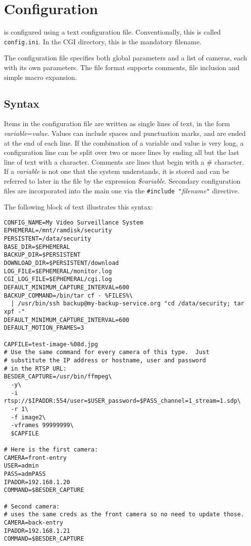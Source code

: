 \clearpage
\section{Configuration}
\label{config}

  \PRODUCT{} is configured using a text configuration file.
  Conventionally, this is called \texttt{config.ini}.  In the
  CGI directory, this is the mandatory filename.

  The configuration file specifies both global parameters and a list of
  cameras, each with its own parameters.  The file format
  supports comments, file inclusion and simple macro expansion.

  \subsection{Syntax}

    \BI
    \I Items in the configuration file are written as single lines of text,
       in the form \emph{variable}=\emph{value}.  Values can include spaces and
       punctuation marks, and are ended at the end of each line.
    \I If the combination of a variable and value is very long,
       a configuration line can be split over two or more lines by
       ending all but the last line of text with a \BS{} character.
    \I Comments are lines that begin with a \# character.
    \I If a \emph{variable} is not one that the
       system understands, it is stored and can be referred to later
       in the file by the expression \emph{\$variable}.
    \I Secondary configuration files are incorporated into the main one
       via the \texttt{\#include "}\emph{filename}\texttt{"} directive.
    \EI

    The following block of text illustrates this syntax:

    \begin{verbatim}
CONFIG_NAME=My Video Surveillance System
EPHEMERAL=/mnt/ramdisk/security
PERSISTENT=/data/security
BASE_DIR=$EPHEMERAL
BACKUP_DIR=$PERSISTENT
DOWNLOAD_DIR=$PERSISTENT/download
LOG_FILE=$EPHEMERAL/monitor.log
CGI_LOG_FILE=$EPHEMERAL/cgi.log
DEFAULT_MINIMUM_CAPTURE_INTERVAL=600
BACKUP_COMMAND=/bin/tar cf - %FILES%\
  | /usr/bin/ssh backup@my-backup-service.org "cd /data/security; tar xpf -"
DEFAULT_MINIMUM_CAPTURE_INTERVAL=600
DEFAULT_MOTION_FRAMES=3

CAPFILE=test-image-%08d.jpg
# Use the same command for every camera of this type.  Just
# substitute the IP address or hostname, user and password
# in the RTSP URL:
BESDER_CAPTURE=/usr/bin/ffmpeg\
  -y\
  -i rtsp://$IPADDR:554/user=$USER_password=$PASS_channel=1_stream=1.sdp\
  -r 1\
  -f image2\
  -vframes 99999999\
  $CAPFILE

# Here is the first camera:
CAMERA=front-entry
USER=admin
PASS=admPASS
IPADDR=192.168.1.20
COMMAND=$BESDER_CAPTURE

# Second camera:
# uses the same creds as the front camera so no need to update those.
CAMERA=back-entry
IPADDR=192.168.1.21
COMMAND=$BESDER_CAPTURE
    \end{verbatim}

